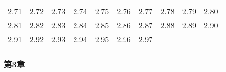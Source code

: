 \begin{tabular}{llllllllll}
\\ 
\hyperref[練習問題 2.71]{2.71} &
\hyperref[練習問題 2.72]{2.72} &
\hyperref[練習問題 2.73]{2.73} &
\hyperref[練習問題 2.74]{2.74} &
\hyperref[練習問題 2.75]{2.75} &
\hyperref[練習問題 2.76]{2.76} &
\hyperref[練習問題 2.77]{2.77} &
\hyperref[練習問題 2.78]{2.78} &
\hyperref[練習問題 2.79]{2.79} &
\hyperref[練習問題 2.80]{2.80}
\\ 
\hyperref[練習問題 2.81]{2.81} &
\hyperref[練習問題 2.82]{2.82} &
\hyperref[練習問題 2.83]{2.83} &
\hyperref[練習問題 2.84]{2.84} &
\hyperref[練習問題 2.85]{2.85} &
\hyperref[練習問題 2.86]{2.86} &
\hyperref[練習問題 2.87]{2.87} &
\hyperref[練習問題 2.88]{2.88} &
\hyperref[練習問題 2.89]{2.89} &
\hyperref[練習問題 2.90]{2.90}
\\ 
\hyperref[練習問題 2.91]{2.91} &
\hyperref[練習問題 2.92]{2.92} &
\hyperref[練習問題 2.93]{2.93} &
\hyperref[練習問題 2.94]{2.94} &
\hyperref[練習問題 2.95]{2.95} &
\hyperref[練習問題 2.96]{2.96} &
\hyperref[練習問題 2.97]{2.97} &
\end{tabular} 

\subsubsection*{第3章} 


